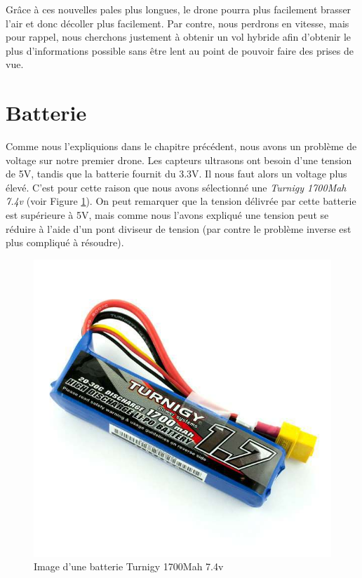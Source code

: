 \documentclass[a4paper,10pt]{report}
\begin{document}
      Grâce à ces nouvelles pales plus longues, le drone pourra plus facilement 
brasser l'air et donc décoller plus facilement. Par contre, nous perdrons en 
vitesse, mais pour rappel, nous cherchons justement à obtenir un vol hybride 
afin d'obtenir le plus d'informations possible sans être lent au point de 
pouvoir faire des prises de vue.

    \section{Batterie}
      Comme nous l'expliquions dans le chapitre précédent, nous avons un 
problème de voltage sur notre premier drone. Les capteurs ultrasons ont besoin 
d'une tension de 5V, tandis que la batterie fournit du 3.3V. Il nous faut alors 
un voltage plus élevé. C'est pour cette raison que nous avons sélectionné une 
\textit{Turnigy 1700Mah 7.4v} (voir Figure \ref{batterie}). On peut remarquer 
que la tension délivrée par cette batterie est supérieure à 5V, mais comme nous 
l'avons expliqué une tension peut se réduire à l'aide d'un pont diviseur de 
tension (par contre le problème inverse est plus compliqué à résoudre).

      \begin{figure}[htbp]
	\centering
	\includegraphics[scale = 0.25]{img/nouvellebatterie.jpg}
	\caption{Image d'une batterie Turnigy 1700Mah 7.4v}
	\label{batterie}
      \end{figure}
\end{document}
